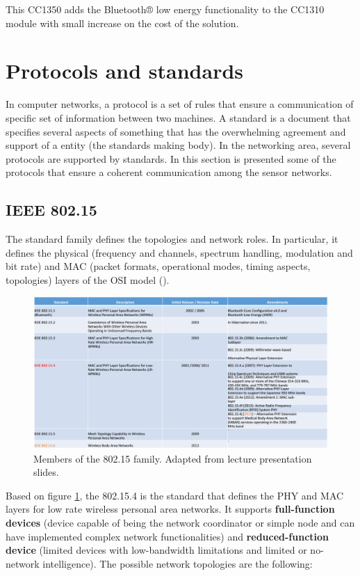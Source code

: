 This CC1350 adds the Bluetooth® low energy functionality to the CC1310 module with small increase on the cost of the solution. 

\section{Protocols and standards}

In computer networks, a protocol is a set of rules that ensure a communication of specific set of information between two machines. A standard is a document that specifies several aspects of something that has the overwhelming agreement and support of a entity (the standards making body). In the networking area, several protocols are supported by standards. In this section is presented some of the protocols that ensure a coherent communication among the sensor networks.

\subsection{IEEE 802.15}

The standard family defines the topologies and network roles. In particular, it defines the physical (frequency and channels, spectrum handling, modulation and bit rate) and MAC (packet formats, operational modes, timing aspects, topologies) layers of the OSI model (\cite{Hackmann2006}).


\begin{figure}[h!]
	\centering
	\includegraphics[width=1.1\textwidth,keepaspectratio]{figures/nancy2014}
	\caption{Members of the 802.15 family. Adapted from \cite{nancy2014} lecture presentation slides.}
	\label{fig:nancy2014}
\end{figure}

Based on figure \ref{fig:nancy2014}, the 802.15.4 is the standard that defines the PHY and MAC layers for low rate wireless personal area networks. It supports \textbf{full-function devices} (device capable of being the network coordinator or simple node and can have implemented complex network functionalities) and \textbf{reduced-function device} (limited devices with low-bandwidth limitations and limited or no-network intelligence). The possible network topologies are the following:

